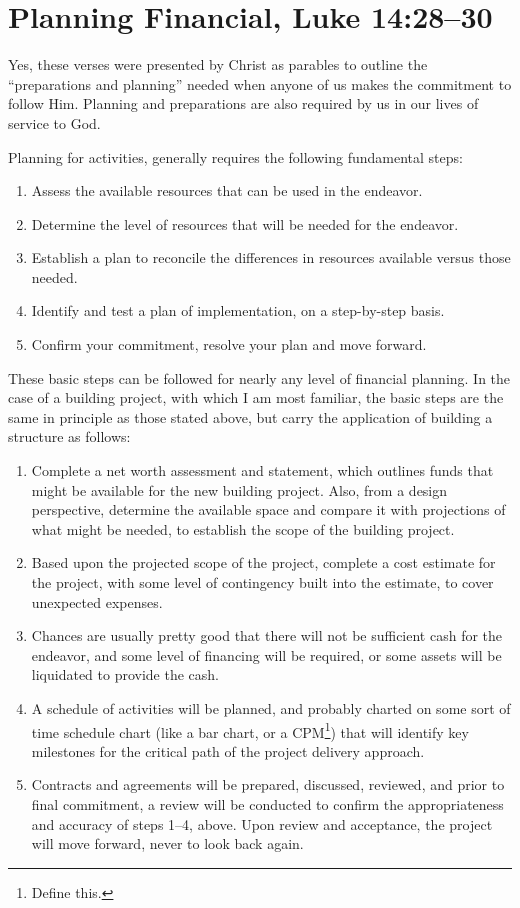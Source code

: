 \documentclass[12pt]{memoir}
\begin{document}
\section{Planning Financial, Luke 14:28--30}

Yes, these verses were presented by Christ as parables to outline
the ``preparations and planning'' needed when anyone of us makes
the commitment to follow Him. Planning and preparations are also required
by us in our lives of service to God. 

Planning for activities, generally requires the following fundamental
steps:
\begin{enumerate}
\item Assess the available resources that can be used in the endeavor. 
\item Determine the level of resources that will be needed for the endeavor. 
\item Establish a plan to reconcile the differences in resources available
versus those needed. 
\item Identify and test a plan of implementation, on a step-by-step basis. 
\item Confirm your commitment, resolve your plan and move forward. 
\end{enumerate}
These basic steps can be followed for nearly any level of financial
planning. In the case of a building project, with which I am most
familiar, the basic steps are the same in principle as those stated
above, but carry the application of building a structure as follows:
\begin{enumerate}
\item Complete a net worth assessment and statement, which outlines funds
that might be available for the new building project. Also, from a
design perspective, determine the available space and compare it with
projections of what might be needed, to establish the scope of the
building project. 
\item Based upon the projected scope of the project, complete a cost estimate
for the project, with some level of contingency built into the estimate,
to cover unexpected expenses. 
\item Chances are usually pretty good that there will not be sufficient
cash for the endeavor, and some level of financing will be required,
or some assets will be liquidated to provide the cash.  
\item A schedule of activities will be planned, and probably charted on
some sort of time schedule chart (like a bar chart, or a CPM\footnote{Define this.})
that will identify key milestones for the critical path of the project
delivery approach. 
\item Contracts and agreements will be prepared, discussed, reviewed, and
prior to final commitment, a review will be conducted to confirm the
appropriateness and accuracy of steps 1--4, above. Upon review and
acceptance, the project will move forward, never to look back again. 
\end{enumerate}
\end{document}
